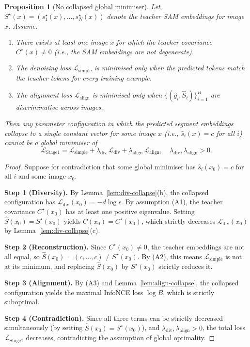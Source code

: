 \documentclass[12pt]{article}
\newtheorem{proposition}{Proposition}
\begin{document}
\begin{proposition}[No collapsed global minimiser]
\label{prop:no-collapse}
Let $S^\star(x) = (s_1^\star(x), \ldots, s_N^\star(x))$ denote
the teacher SAM embeddings for image $x$.
Assume:
\begin{enumerate}
    \item[\textup{(A1)}] There exists at least one image $x$ for which the
    teacher covariance $C^\star(x) \neq 0$
    (i.e., the SAM embeddings are not degenerate).
    \item[\textup{(A2)}] The denoising loss $\mathcal{L}_{\mathrm{simple}}$
    is minimised only when the predicted tokens match the teacher tokens
    for every training example.
    \item[\textup{(A3)}] The alignment loss $\mathcal{L}_{\mathrm{align}}$
    is minimised only when $\{(\hat{g}_i, \hat{S}_i)\}_{i=1}^{B}$
    are discriminative across images.
\end{enumerate}
Then any parameter configuration in which the predicted segment
embeddings collapse to a single constant vector for some image $x$
(i.e., $\hat{s}_i(x) = c$ for all $i$) cannot be a global minimiser of
\begin{equation}
    \mathcal{L}_{\mathrm{Stage1}}
    = \mathcal{L}_{\mathrm{simple}}
    + \lambda_{\mathrm{div}}\, \mathcal{L}_{\mathrm{div}}
    + \lambda_{\mathrm{align}}\, \mathcal{L}_{\mathrm{align}},
    \quad \lambda_{\mathrm{div}}, \lambda_{\mathrm{align}} > 0.
\end{equation}
\end{proposition}

\begin{proof}
Suppose for contradiction that some global minimiser has
$\hat{s}_i(x_0) = c$ for all $i$ and some image $x_0$.

\textbf{Step 1 (Diversity).}
By Lemma~\ref{lem:div-collapse}(b), the collapsed configuration has
$\mathcal{L}_{\mathrm{div}}(x_0) = -d\log\epsilon$.
By assumption (A1), the teacher covariance $C^\star(x_0)$ has at least one
positive eigenvalue.
Setting $\hat{S}(x_0) = S^\star(x_0)$ yields
$C(x_0) = C^\star(x_0)$, which strictly decreases
$\mathcal{L}_{\mathrm{div}}(x_0)$ by Lemma~\ref{lem:div-collapse}(c).

\textbf{Step 2 (Reconstruction).}
Since $C^\star(x_0) \neq 0$, the teacher embeddings are not all equal,
so $\hat{S}(x_0) = (c, \ldots, c) \neq S^\star(x_0)$.
By (A2), this means $\mathcal{L}_{\mathrm{simple}}$ is not at its minimum,
and replacing $\hat{S}(x_0)$ by $S^\star(x_0)$ strictly reduces it.

\textbf{Step 3 (Alignment).}
By (A3) and Lemma~\ref{lem:align-collapse},
the collapsed configuration yields the maximal InfoNCE loss $\log B$,
which is strictly suboptimal.

\textbf{Step 4 (Contradiction).}
Since all three terms can be strictly decreased simultaneously
(by setting $\hat{S}(x_0) = S^\star(x_0)$), and $\lambda_{\mathrm{div}}, \lambda_{\mathrm{align}} > 0$,
the total loss $\mathcal{L}_{\mathrm{Stage1}}$ decreases,
contradicting the assumption of global optimality.
\end{proof}
\end{document}
